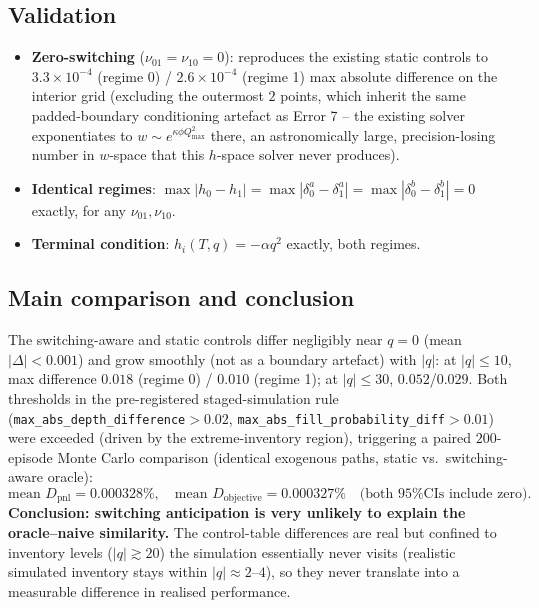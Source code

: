\documentclass[11pt]{article}
\begin{document}
\subsection{Validation}
\begin{itemize}
\item \textbf{Zero-switching} ($\nu_{01}=\nu_{10}=0$): reproduces the existing static controls to $3.3\times10^{-4}$ (regime 0) / $2.6\times10^{-4}$ (regime 1) max absolute difference on the interior grid (excluding the outermost $2$ points, which inherit the same padded-boundary conditioning artefact as Error 7 -- the existing solver exponentiates to $w\sim e^{\kappa\phi Q_{\max}^2}$ there, an astronomically large, precision-losing number in $w$-space that this $h$-space solver never produces).
\item \textbf{Identical regimes}: $\max|h_0-h_1| = \max|\delta^a_0-\delta^a_1| = \max|\delta^b_0-\delta^b_1| = 0$ exactly, for any $\nu_{01},\nu_{10}$.
\item \textbf{Terminal condition}: $h_i(T,q)=-\alpha q^2$ exactly, both regimes.
\end{itemize}

\subsection{Main comparison and conclusion}
The switching-aware and static controls differ negligibly near $q=0$ (mean $|{\Delta}|<0.001$) and grow smoothly (not as a boundary artefact) with $|q|$: at $|q|\le 10$, max difference $0.018$ (regime 0) / $0.010$ (regime 1); at $|q|\le 30$, $0.052$/$0.029$. Both thresholds in the pre-registered staged-simulation rule (\texttt{max\_abs\_depth\_difference}$>0.02$, \texttt{max\_abs\_fill\_probability\_diff}$>0.01$) were exceeded (driven by the extreme-inventory region), triggering a paired $200$-episode Monte Carlo comparison (identical exogenous paths, static vs.\ switching-aware oracle):
\begin{equation}
\text{mean } D_{\text{pnl}} = 0.000328\%,\quad \text{mean } D_{\text{objective}} = 0.000327\% \quad \text{(both 95\% CIs include zero).}
\end{equation}
\textbf{Conclusion: switching anticipation is very unlikely to explain the oracle--naive similarity.} The control-table differences are real but confined to inventory levels ($|q|\gtrsim 20$) the simulation essentially never visits (realistic simulated inventory stays within $|q|\approx 2$--$4$), so they never translate into a measurable difference in realised performance.
\end{document}
